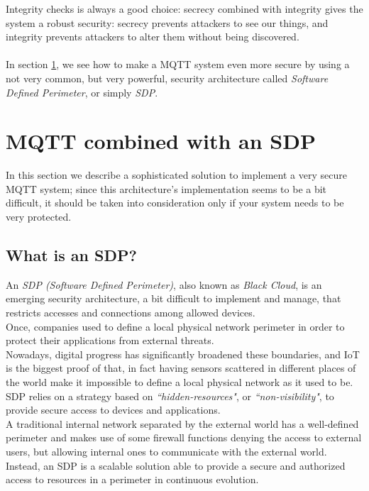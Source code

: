 \documentclass[12pt]{report}
\begin{document}
{{Integrity checks is always a good choice: secrecy combined with integrity gives the system a robust security: secrecy prevents attackers to see our things, and integrity prevents attackers to alter them without being discovered.\\\\
In section \ref{sec:mqttsdp}, we see how to make a MQTT system even more secure by using a not very common, but very powerful, security architecture called \emph{Software Defined Perimeter}, or simply \emph{SDP}.\\


\section{MQTT combined with an SDP}
\label{sec:mqttsdp}
\bigskip
In this section we describe a sophisticated solution to implement a very secure MQTT system; since this architecture's implementation seems to be a bit difficult, it should be taken into consideration only if your system needs to be very protected.\\

\subsection{What is an SDP?}
\bigskip
An \emph{SDP (Software Defined Perimeter)}, also known as \emph{Black Cloud}, is an emerging security architecture, a bit difficult to implement and manage, that restricts accesses and connections among allowed devices.\\
Once, companies used to define a local physical network perimeter in order to protect their applications from external threats.\\
Nowadays, digital progress has significantly broadened these boundaries, and IoT is the biggest proof of that, in fact having sensors scattered in different places of the world make it impossible to define a local physical network as it used to be.\\

SDP relies on a strategy based on \emph{``hidden-resources"}, or \emph{``non-visibility"}, to provide secure access to devices and applications.\\
A traditional internal network separated by the external world has a well-defined perimeter and makes use of some firewall functions denying the access to external users, but allowing internal ones to communicate with the external world.\\
Instead, an SDP is a scalable solution able to provide a secure and authorized access to resources in a perimeter in continuous evolution.\\

}}
\end{document}
